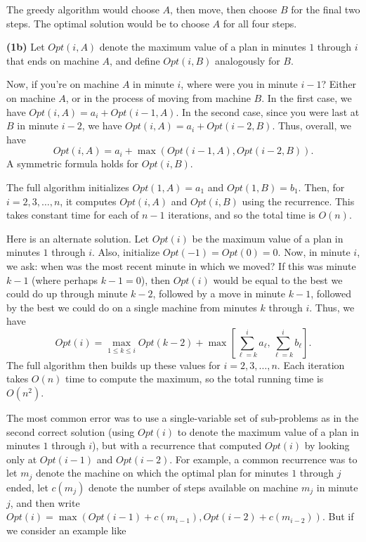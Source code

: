 \documentclass[12pt]{article}
\begin{document}
\begin{enumerate}
{The greedy algorithm would choose $A$, then move,
then choose $B$ for the final two steps.
The optimal solution would be to choose $A$ for
all four steps.

\medskip

{\bf (1b)}
Let $Opt(i,A)$ denote the maximum value of a plan in minutes
$1$ through $i$ that ends on machine $A$,
and define $Opt(i,B)$ analogously for $B$.

Now, if you're on machine $A$ in minute $i$, where
were you in minute $i-1$?
Either on machine $A$, or in the process of moving from machine $B$.
In the first case, we have
$Opt(i,A) = a_i + Opt(i-1,A)$.
In the second case, since you were last at $B$ in minute $i-2$, we have
$Opt(i,A) = a_i + Opt(i-2,B)$.
Thus, overall, we have
$$Opt(i,A) = a_i + \max(Opt(i-1,A), Opt(i-2,B)).$$
A symmetric formula holds for $Opt(i,B)$.

The full algorithm initializes $Opt(1,A) = a_1$ and $Opt(1,B) = b_1$.
Then, for $i = 2, 3, \ldots, n$, it computes
$Opt(i,A)$ and $Opt(i,B)$ using the recurrence.
This takes constant time for each of $n-1$ iterations,
and so the total time is $O(n)$.

Here is an alternate solution.
Let $Opt(i)$ be the maximum value
of a plan in minutes $1$ through $i$.
Also, initialize $Opt(-1) = Opt(0) = 0$.
Now, in minute $i$, we ask: when was the most recent minute
in which we moved?
If this was minute $k-1$ (where perhaps $k-1 = 0$),
then $Opt(i)$ would be equal to the best we could do
up through minute $k-2$, followed by a move in minute $k-1$,
followed by the best we could do on a single machine from
minutes $k$ through $i$.
Thus, we have
$$Opt(i) = \max_{1 \leq k \leq i} Opt(k-2) +
\max\left[\sum_{\ell=k}^i a_\ell , \sum_{\ell=k}^i b_\ell\right].$$
The full algorithm then builds up these values
for $i = 2, 3, \ldots, n$.
Each iteration takes $O(n)$ time to compute the maximum,
so the total running time is $O(n^2)$.

\medskip
The most common error was to use a single-variable set of
sub-problems as in the second correct solution
(using $Opt(i)$ to denote the maximum value
of a plan in minutes $1$ through $i$),
but with a recurrence that computed $Opt(i)$ by
looking only at $Opt(i-1)$ and $Opt(i-2)$.
For example, a common recurrence was to let $m_j$
denote the machine on which the optimal plan
for minutes $1$ through $j$ ended,
let $c(m_j)$ denote the number of steps
available on machine $m_j$ in minute $j$,
and then write
$Opt(i) = \max(Opt(i-1) + c(m_{i-1}), Opt(i-2) + c(m_{i-2}))$.
But if we consider an example like

}
\end{enumerate}
\end{document}
